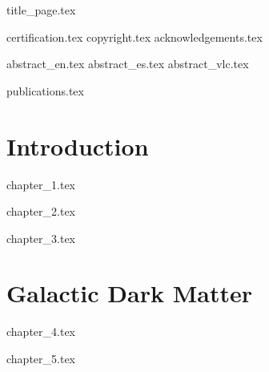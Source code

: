 \documentclass[a4paper,11pt,twoside,oldfontcommands]{memoir}
\begin{document}
\frontmatter
{title_page.tex}
\clearemptydoublepage


{certification.tex}
{copyright.tex}
\clearemptydoublepage
{acknowledgements.tex}
\clearemptydoublepage

{abstract_en.tex}
\clearemptydoublepage
{abstract_es.tex}
\clearemptydoublepage
{abstract_vlc.tex}
\clearemptydoublepage


{publications.tex}
\clearemptydoublepage

\renewcommand{\contentsname}{Table of Contents}
\bgroup
\tableofcontents*
\egroup
\renewcommand*{\arraystretch}{0.5}



\mainmatter

\part{Introduction}

{chapter_1.tex}
\clearemptydoublepage

{chapter_2.tex}
\clearemptydoublepage

{chapter_3.tex}
\clearemptydoublepage

\part{Galactic Dark Matter}

{chapter_4.tex}
\clearemptydoublepage

{chapter_5.tex}
\clearemptydoublepage
\end{document}
